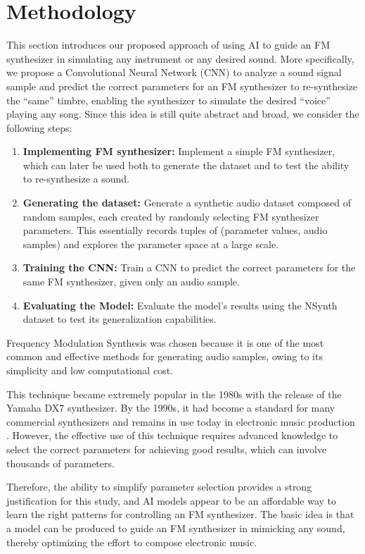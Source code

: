 \documentclass[10pt,conference]{IEEEtran}
\begin{document}
\section{Methodology} \label{sec:our_proposal}

This section introduces our proposed approach of using AI to guide an FM synthesizer in simulating any instrument or any desired sound. More specifically, we propose a Convolutional Neural Network (CNN) to analyze a sound signal sample and predict the correct parameters for an FM synthesizer to re-synthesize the ``same'' timbre, enabling the synthesizer to simulate the desired ``voice'' playing any song. Since this idea is still quite abstract and broad, we consider the following steps:

\begin{enumerate}
    \item \textbf{Implementing FM synthesizer:} Implement a simple FM synthesizer, which can later be used both to generate the dataset and to test the ability to re-synthesize a sound.
    \item \textbf{Generating the dataset:} Generate a synthetic audio dataset composed of random samples, each created by randomly selecting FM synthesizer parameters. This essentially records tuples of (parameter values, audio samples) and explores the parameter space at a large scale.
    \item \textbf{Training the CNN:} Train a CNN to predict the correct parameters for the same FM synthesizer, given only an audio sample.
    \item \textbf{Evaluating the Model:} Evaluate the model's results using the NSynth dataset to test its generalization capabilities.
\end{enumerate}

Frequency Modulation Synthesis was chosen because it is one of the most common and effective methods for generating audio samples, owing to its simplicity and low computational cost.

This technique became extremely popular in the 1980s with the release of the Yamaha DX7 synthesizer. By the 1990s, it had become a standard for many commercial synthesizers and remains in use today in electronic music production \cite{claesson2021resynthesis}. However, the effective use of this technique requires advanced knowledge to select the correct parameters for achieving good results, which can involve thousands of parameters.

Therefore, the ability to simplify parameter selection provides a strong justification for this study, and AI models appear to be an affordable way to learn the right patterns for controlling an FM synthesizer. The basic idea is that a model can be produced to guide an FM synthesizer in mimicking any sound, thereby optimizing the effort to compose electronic music.
\end{document}
